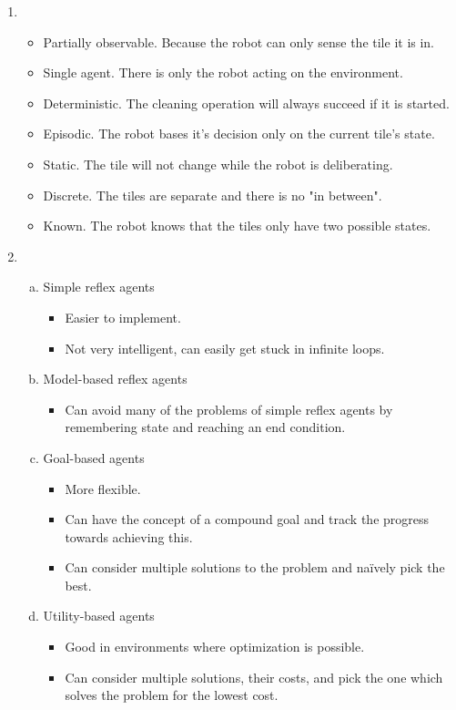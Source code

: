 \begin{enumerate}
    \newpage
    \item
        \begin{itemize}
            \item   Partially observable. Because the robot can only sense the tile it is in.
            \item   Single agent. There is only the robot acting on the environment.
            \item   Deterministic. The cleaning operation will always succeed if it is started.
            \item   Episodic. The robot bases it's decision only on the current tile's state.
            \item   Static. The tile will not change while the robot is deliberating.
            \item   Discrete. The tiles are separate and there is no "in between".
            \item   Known. The robot knows that the tiles only have two possible states.
        \end{itemize}
    \item
        \begin{enumerate}[(a)]
            \item   Simple reflex agents
                \begin{itemize}
                    \item   Easier to implement.
                    \item   Not very intelligent, can easily get stuck in infinite loops.
                \end{itemize}
            \item   Model-based reflex agents
                \begin{itemize}
                    \item   Can avoid many of the problems of simple reflex agents by remembering state and reaching an end condition.
                \end{itemize}
            \item   Goal-based agents
                \begin{itemize}
                    \item   More flexible.
                    \item   Can have the concept of a compound goal and track the progress towards achieving this.
                    \item   Can consider multiple solutions to the problem and naïvely pick the best.
                \end{itemize}
            \item   Utility-based agents
                \begin{itemize}
                    \item   Good in environments where optimization is possible.
                    \item   Can consider multiple solutions, their costs, and pick the one which solves the problem for the lowest cost.
                \end{itemize}
        \end{enumerate}
\end{enumerate}
